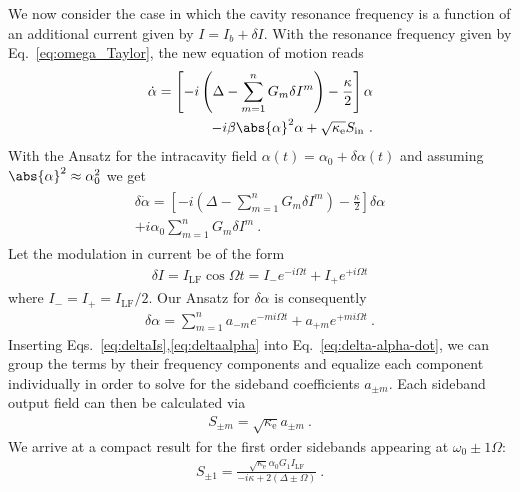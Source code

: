 We now consider the case in which the cavity resonance frequency is a function of an additional current given by $I = I_b + \delta I$.
% 
With the resonance frequency given by Eq.~\eqref{eq:omega_Taylor}, the new equation of motion reads
% 
\begin{align}
\begin{split}
\dot{\alpha}=\left[ -i\left( \Delta -\sum_{m=1}^n G_m \delta I^m \right) - \frac{\kappa}{2} \right] \alpha \\
-i\beta\abs{\alpha}^2\alpha +\sqrt{\kappa_\text{e}}S_\text{in}\ .
\end{split}
\end{align}
% 
With the Ansatz for the intracavity field $\alpha(t)=\alpha_0+\delta\alpha(t)$ and assuming $\abs{\alpha}^2 \approx \alpha_0^2$ we get
% 
\begin{align}
\begin{split}
\delta\dot{\alpha}=\left[ -i\left( \Delta - \sum_{m=1}^n G_m \delta I^m \right) -\frac{\kappa}{2} \right] \delta\alpha \\
+i \alpha_0 \sum_{m=1}^n G_m \delta I^m \ .
\label{eq:delta-alpha-dot}
\end{split}
\end{align}
% 
Let the modulation in current be of the form
% 
\begin{align}
\delta I=I_\text{LF}\cos\Omega t = I_{-}e^{-i\Omega t} + I_{+}e^{+i\Omega t}
\label{eq:deltaIs}
\end{align}
% 
where $I_{-}=I_{+}=I_\text{LF}/2$.
% 
Our Ansatz for $\delta\alpha$ is consequently
% 
\begin{align}
\delta\alpha=\sum_{m=1}^n a_{-m}e^{-mi\Omega t} + a_{+m}e^{+mi\Omega t}\ .
\label{eq:deltaalpha}
\end{align}
% 
Inserting Eqs.~\eqref{eq:deltaIs},\eqref{eq:deltaalpha} into Eq.~\eqref{eq:delta-alpha-dot}, we can group the terms by their frequency components and equalize each component individually in order to solve for the sideband coefficients $a_{\pm m}$.
% 
Each sideband output field can then be calculated via
% 
\begin{align}
S_{\pm m} = \sqrt{\kappa_\text{e}} a_{\pm m}\ .
\end{align}
% 
We arrive at a compact result for the first order sidebands appearing at $\omega_0\pm1\Omega$:
% 
\begin{align}
S_{\pm 1} = \frac{\sqrt{\kappa_\text{e}}\alpha_0 G_1 I_\text{LF}}{-i\kappa+2(\Delta\pm\Omega)}\ .
\label{eq:input-output-first}
\end{align}

